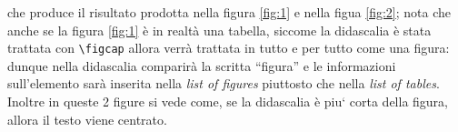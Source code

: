 \documentclass[a4paper,twoside]{article}
\begin{document}
che produce il risultato prodotta nella figura \ref{fig:1} e nella figua
\ref{fig:2}; nota che anche se la figura \ref{fig:1} \`e in realt\`a una
tabella, siccome la didascalia \`e stata trattata con \verb!\figcap!
allora verr\`a trattata in tutto e per tutto come una figura: dunque 
nella didascalia comparir\`a la scritta ``figura'' e le informazioni
sull'elemento sar\`a inserita nella {\sl list of figures} piuttosto che nella
{\sl list of tables\/}.
Inoltre in queste 2 figure si vede come, se la didascalia \`e piu` corta
della figura, allora il testo viene centrato.
\end{document}
